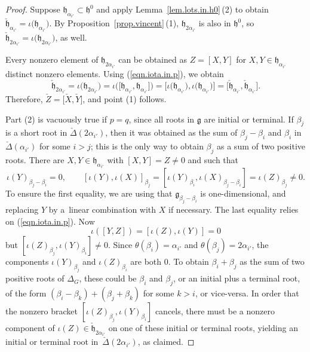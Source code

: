 \documentclass[10pt,a4paper]{amsart}
\numberwithin{equation}{section}
\theoremstyle{definition}
\newcommand{\lieg}{\mathfrak{g}}
\newcommand{\lieh}{\mathfrak{h}}
\begin{document}
\begin{proof}
Suppose $\lieh_{ \alpha_{i'}} \subset \lieh^0$ and apply Lemma~\ref{lem.lots.in.h0}\,(2) to obtain $\check{\lieh}_{ \alpha_{i'}} = \iota\bigl(\lieh_{ \alpha_{i'}}\bigr)$. By Proposition~\ref{prop.vincent}\,(1), $\lieh_{2 \alpha_{i'}}$ is also in $\lieh^0$, so $\check{\lieh}_{2 \alpha_{i'}} = \iota\bigl(\lieh_{2 \alpha_{i'}}\bigr)$, as well.

Every nonzero element of $\lieh_{2 \alpha_{i'}}$ can be obtained as $Z = [X,Y]$ for $X,Y \in \lieh_{\alpha_{i'}}$ distinct nonzero elements. Using (\ref{eqn.iota.in.p}), we obtain
\[\check{\lieh}_{2 \alpha_{i'}} = \iota\bigl(\lieh_{2\alpha_{i'}}\bigr) = \iota \bigl( \bigl[ \lieh_{\alpha_{i'}}, \lieh_{\alpha_{i'}}\bigr] \bigr) = \bigl[ \iota\bigl(\lieh_{ \alpha_{i'}}\bigr), \iota\bigl(\lieh_{ \alpha_{i'}}\bigr)\bigr] = \bigl[ \check{\lieh}_{\alpha_{i'}}, \check{\lieh}_{\alpha_{i'}}\bigr].\]
Therefore, $\check{Z} = \bigl[\check{X},\check{Y}\bigr]$, and
point (1) follows.

Part (2) is vacuously true if $p=q$, since all roots in $\lieg$ are initial or terminal.
If $\beta_j$ is a short root in $\check{\Delta}(2 \alpha_{i'})$, then it was obtained as the sum of $\beta_j - \beta_i$ and $\beta_i$ in $\check{\Delta}(\alpha_{i'})$ for some $i > j$; this is the only way to obtain $\beta_j$ as a sum of two positive roots. There are $X,Y \in \lieh_{\alpha_{i'}}$ with $[X,Y]=Z \neq 0$ and
such that
\[
\iota(Y)_{\beta_j - \beta_i} = 0, \qquad
[\iota(Y),\iota(X)]_{\beta_j} = [\iota(Y)_{\beta_i}, \iota(X)_{\beta_j - \beta_i}] = \iota(Z)_{\beta_j} \neq 0.\]
To ensure the first equality, we are using that $\lieg_{\beta_j-\beta_i}$ is one-dimensional, and replacing $Y$ by a~linear combination with $X$ if necessary. The last equality relies on (\ref{eqn.iota.in.p}).
Now
\[
\iota([Y,Z]) = [\iota(Z),\iota(Y)] = 0
\] but $[ \iota(Z)_{\beta_j},\iota(Y)_{\beta_i}] \neq 0$. Since $\theta(\beta_i) = \alpha_{i'}$ and $\theta(\beta_j) = 2 \alpha_{i'}$, the components
$\iota(Y)_{\beta_j}$ and $\iota(Z)_{\beta_i}$ are both $0$. To obtain $\beta_i + \beta_j$ as the sum of two positive roots of $\Delta_G$, these could be $\beta_i$ and $\beta_j$, or an initial plus a terminal root, of the form $(\beta_i - \beta_k) + (\beta_j + \beta_k)$ for some $k > i$, or vice-versa. In order that the nonzero bracket $[ \iota(Z)_{\beta_j},\iota(Y)_{\beta_i}]$ cancels, there must be a nonzero component of $\iota(Z) \in \check{\lieh}_{2 \alpha_{i'}}$ on one of these initial or terminal roots, yielding an initial or terminal root in~$\check{\Delta}(2 \alpha_{i'})$, as claimed.
\end{proof}
\end{document}
